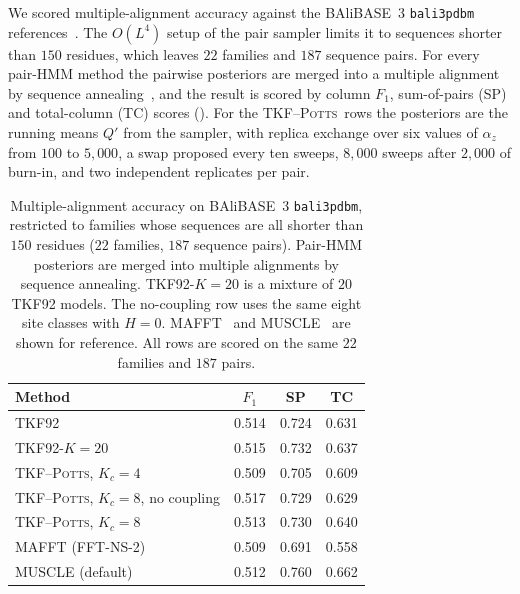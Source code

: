 \documentclass[11pt]{article}
\newcommand{\Potts}{\textsc{TKF--Potts}}
\begin{document}
We scored multiple-alignment accuracy against the BAliBASE~3
\texttt{bali3pdbm} references~\citep{Thompson1999}. The $O(L^4)$ setup of the
pair sampler limits it to sequences shorter than $150$ residues, which leaves
$22$ families and $187$ sequence pairs. For every pair-HMM method the
pairwise posteriors are merged into a multiple alignment by sequence
annealing~\citep{BradleyEtAl2009}, and the result is scored by column $F_1$,
sum-of-pairs (SP) and total-column (TC) scores (). For the
\Potts\ rows the posteriors are the running means $Q'$ from the sampler,
with replica exchange over six values of $\alpha_z$ from $100$ to
$5{,}000$, a swap proposed every ten sweeps, $8{,}000$ sweeps after $2{,}000$
of burn-in, and two independent replicates per pair.

\begin{table}[t]
\caption{Multiple-alignment accuracy on BAliBASE~3 \texttt{bali3pdbm},
restricted to families whose sequences are all shorter than $150$ residues
($22$ families, $187$ sequence pairs). Pair-HMM posteriors are merged into
multiple alignments by sequence annealing. TKF92-$K{=}20$ is a mixture of
$20$ TKF92 models. The no-coupling row uses the same eight site classes with
$H=0$. MAFFT~\citep{Katoh2013} and MUSCLE~\citep{Edgar2004} are shown for
reference. All rows are scored on the same $22$ families and $187$ pairs.}
\label{tab:aln}
\centering
\setlength{\tabcolsep}{6pt}
\begin{tabular}{lccc}
\toprule
Method & $F_1$ & SP & TC\\
\midrule
TKF92                                   & 0.514 & 0.724 & 0.631\\
TKF92-$K{=}20$                          & 0.515 & 0.732 & 0.637\\
\Potts, $K_c{=}4$                        & 0.509 & 0.705 & 0.609\\
\Potts, $K_c{=}8$, no coupling           & 0.517 & 0.729 & 0.629\\
\Potts, $K_c{=}8$                        & 0.513 & 0.730 & 0.640\\
\midrule
MAFFT (FFT-NS-2)                        & 0.509 & 0.691 & 0.558\\
MUSCLE (default)                        & 0.512 & 0.760 & 0.662\\
\bottomrule
\end{tabular}
\end{table}
\end{document}
